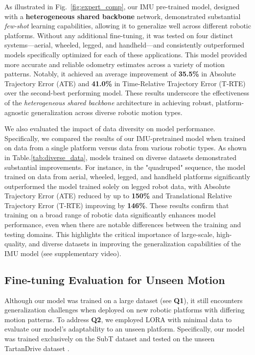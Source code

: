 As illustrated in Fig.~\ref{fig:expert_comp}, our IMU pre-trained model, designed with a \textbf{heterogeneous shared backbone} network, demonstrated substantial \textit{few-shot} learning capabilities, allowing it to generalize well across different robotic platforms. Without any additional fine-tuning, it was tested on four distinct systems—aerial, wheeled, legged, and handheld—and consistently outperformed models specifically optimized for each of these applications. This model provided more accurate and reliable odometry estimates across a variety of motion patterns. Notably, it achieved an average improvement of \textbf{35.5\%} in Absolute Trajectory Error (ATE) and \textbf{41.0\%} in Time-Relative Trajectory Error (T-RTE) over the second-best performing model. These results underscore the effectiveness of the \textit{heterogeneous shared backbone} architecture in achieving robust, platform-agnostic generalization across diverse robotic motion types.

We also evaluated the impact of data diversity on model performance. Specifically, we compared the results of our IMU-pretrained model when trained on data from a single platform versus data from various robotic types. As shown in Table.\ref{tab:diverse_data}, models trained on diverse datasets demonstrated substantial improvements. For instance, in the "quadruped" sequence, the model trained on data from aerial, wheeled, legged, and handheld platforms significantly outperformed the model trained solely on legged robot data, with Absolute Trajectory Error (ATE) reduced by up to \textbf{150\%} and Translational Relative Trajectory Error (T-RTE) improving by \textbf{146\%}.
These results confirm that training on a broad range of robotic data significantly enhances model performance, even when there are notable differences between the training and testing domains. This highlights the critical importance of large-scale, high-quality, and diverse datasets in improving the generalization capabilities of the IMU model (see supplementary video).



\subsection{Fine-tuning Evaluation for Unseen Motion}

Although our model was trained on a large dataset (see \textbf{Q1}), it still encounters generalization challenges when deployed on new robotic platforms with differing motion patterns. To address \textbf{Q2}, we employed LORA with minimal data to evaluate our model's adaptability to an unseen platform. Specifically, our model was trained exclusively on the SubT dataset \cite{zhao2024subt} and tested on the unseen TartanDrive dataset \cite{sivaprakasam2024tartandrive2}.

